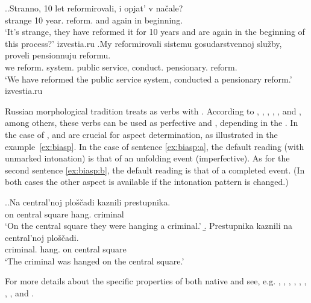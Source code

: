 \ex.\label{ex:biaspectual:borrowed}\ag.Stranno, 10 let reformirovali\textsuperscript{\IPF}, i opjat' v na\v{c}ale?\\
strange 10 year. reform. and again in beginning.\\
\trans `It's strange, they have reformed it for 10 years and are again in the beginning of this process?'
\hfill izvestia.ru
\bg.My reformirovali\textsuperscript{\PF} sistemu gosudarstvennoj slu\v{z}by, proveli pensionnuju reformu.\\
we reform. system. public service, conduct. pensionary. reform.\\
\trans `We have reformed the public service system, conducted a pensionary reform.'
\hfill izvestia.ru

Russian morphological tradition treats  as verbs with . According to \citet{Galton:76}, \citet{Rosenthal:76}, \citet{Shvedova:82}, \citet{Certkova:96}, \citet{ZaliznjakShmelev:00}, and \citet{Janda:07a}, among others,  these verbs can be used as perfective and , depending in the . In the case of ,  and  are crucial for aspect determination, as illustrated in the example~\ref{ex:biasp}. In the case of sentence \ref{ex:biasp:a}, the default reading (with unmarked intonation) is that of an unfolding event (imperfective). As for the second sentence \ref{ex:biasp:b}, the default reading is that of a completed event. (In both cases the other aspect is available if the intonation pattern is changed.)

\ex.\label{ex:biasp}\a.\label{ex:biasp:a}\gll Na central'noj plo\v{s}\v{c}adi kaznili\textsuperscript{\IPF} prestupnika.\\
on central square hang. criminal\\
\glt `On the central square they were hanging a criminal.'
\b.\label{ex:biasp:b} \gll Prestupnika kaznili\textsuperscript{\PF} na central'noj plo\v{s}\v{c}adi.\\
criminal. hang. on central square\\
\glt `The criminal was hanged on the central square.'

For more details about the specific properties of both native and   see, e.g. \citet{Isachenko:60}, \citet{Avilova:68}, \citet{Skott:79}, \citet{Gladney:82}, \citet{Certkova:98}, \citet{Jaszay:99}, \citet{Anderson:02}, \citet{Timberlake:04}, and \citet{Janda:07a}. 

